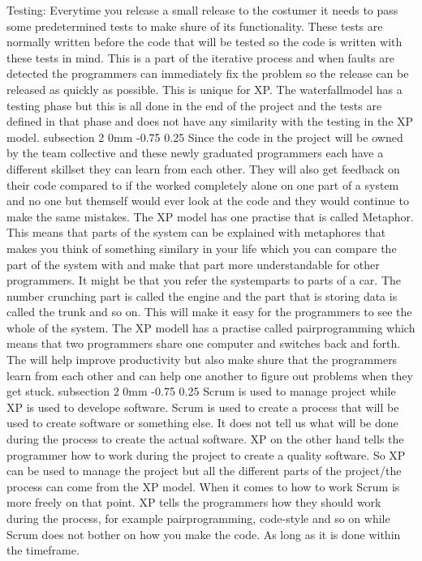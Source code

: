 \documentclass[a4paper,11pt]{article}
\makeatletter
\renewcommand{\subsection}{\@startsection
   {subsection}%
   {2}%
   {0mm}%
   {-0.75\baselineskip}%
   {0.25\baselineskip}%
   {\rmfamily\normalfont\slshape\normalsize}}%
\makeatother
\begin{document}
\newline
Testing:\newline
Everytime you release a small release to the costumer it needs to pass some predetermined tests to make shure of its functionality. These tests are normally written before the code that will be tested so the code is written with these tests in mind. This is a part of the iterative process and when faults are detected the programmers can immediately fix the problem so the release can be released as quickly as possible. This is unique for XP. The waterfallmodel has a testing phase but this is all done in the end of the project and the tests are defined in that phase and does not have any similarity with the testing in the XP model.
\subsection{}
Since the code in the project will be owned by the team collective and these newly graduated programmers each have a different skillset they can learn from each other. They will also get feedback on their code compared to if the worked completely alone on one part of a system and no one but themself would ever look at the code and they would continue to make the same mistakes. 
\newline
\newline
The XP model has one practise that is called Metaphor. This means that parts of the system can be explained with metaphores that makes you think of something similary in your life which you can compare the part of the system with and make that part more understandable for other programmers. It might be that you refer the systemparts to parts of a car. The number crunching part is called the engine and the part that is storing data is called the trunk and so on. This will make it easy for the programmers to see the whole of the system. 
 \newline
 \newline
 The XP modell has a practise called pairprogramming which means that two programmers share one computer and switches back and forth. The will help improve productivity but also make shure that the programmers learn from each other and can help one another to figure out problems when they get stuck. 
 \subsection{}
 Scrum is used to manage project while XP is used to develope software. Scrum is used to create a process that will be used to create software or something else. It does not tell us what will be done during the process to create the actual software. XP on the other hand tells the programmer how to work during the project to create a quality software. So XP can be used to manage the project but all the different parts of the project/the process can come from the XP model. When it comes to how to work Scrum is more freely on that point. XP tells the programmers how they should work during the process, for example pairprogramming, code-style and so on while Scrum does not bother on how you make the code. As long as it is done within the timeframe.
\end{document}
